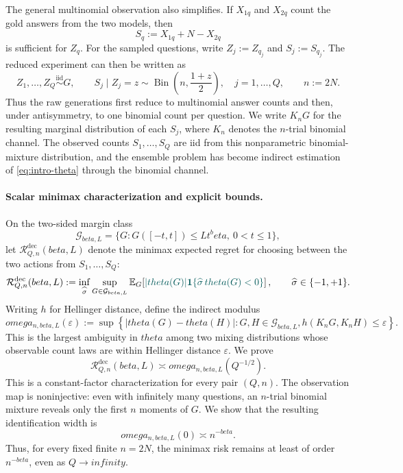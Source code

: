 \documentclass[11pt]{article}
\def\beta{beta}%
\def\theta{theta}%
\def\omega{omega}%
\def\infty{infinity}%
\newcommand{\E}{\mathbb E}
\newcommand{\one}{\mathbf 1}
\newcommand{\Bin}{\operatorname{Bin}}
\newcommand{\calG}{\mathcal G}
\newcommand{\calR}{\mathcal R}
\newcommand{\eps}{\varepsilon}
\newcommand\ced[1]{{\color{teal!70!black} #1}}
\begin{document}
The general multinomial observation also simplifies.  If $X_{1q}$ and $X_{2q}$ count the gold answers from the two models, then
\[
S_q:=X_{1q}+N-X_{2q}
\]
is sufficient for $Z_q$.  For the sampled questions, write $Z_j:=Z_{q_j}$ and $S_j:=S_{q_j}$.  The reduced experiment can then be written as
\begin{equation}
\label{eq:intro-binomial-channel}
Z_1,\ldots,Z_Q\overset{\mathrm{iid}}{\sim}G,
\qquad
S_j\mid Z_j=z
\sim
\Bin\left(n,\frac{1+z}{2}\right),
\quad j=1,\ldots,Q,
\qquad n:=2N.
\end{equation}
Thus the raw generations first reduce to multinomial answer counts and then, under antisymmetry, to one binomial count per question.  We write $K_nG$ for the resulting marginal distribution of each $S_j$, where $K_n$ denotes the $n$-trial binomial channel.  The observed counts $S_1,\ldots,S_Q$ are iid from this nonparametric binomial-mixture distribution, and the ensemble problem has become indirect estimation of \eqref{eq:intro-theta} through the binomial channel.

\paragraph{Scalar minimax characterization and explicit bounds.}
On the two-sided margin class
\[
\calG_{\beta,L}
=
\{G:G([-t,t])\le Lt^\beta,\ 0<t\le1\},
\]
let $\calR^{\mathrm{dec}}_{Q,n}(\beta,L)$ denote the minimax expected regret for choosing between the two actions from $S_1,\ldots,S_Q$:
\[
\calR^{\mathrm{dec}}_{Q,n}(\beta,L)
:=
\inf_{\widehat\sigma}
\sup_{G\in\calG_{\beta,L}}
\E_G\!\left[
\ced{|\theta(G)|
\one\{\widehat\sigma\,\theta(G)<0\}}
\right],
\qquad \widehat\sigma\in\{-1,+1\}.
\]
Writing $h$ for Hellinger distance, define the indirect modulus
\[
\omega_{n,\beta,L}(\eps)
:=
\sup\left\{
|\theta(G)-\theta(H)|:
G,H\in\calG_{\beta,L},
h(K_nG,K_nH)\le\eps
\right\}.
\]
This is the largest ambiguity in $\theta$ among two mixing distributions whose observable count laws are within Hellinger distance $\eps$.  We prove %
\begin{equation}
\label{eq:intro-modulus}
\calR^{\mathrm{dec}}_{Q,n}(\beta,L)
\asymp
\omega_{n,\beta,L}(Q^{-1/2}).
\end{equation}
This is a constant-factor characterization for every pair $(Q,n)$.  The observation map is noninjective: even with infinitely many questions, an $n$-trial binomial mixture reveals only the first $n$ moments of $G$.  We show that the resulting identification width is
\begin{equation}
\label{eq:intro-floor}
\omega_{n,\beta,L}(0)
\asymp
n^{-\beta}.
\end{equation}
Thus, for every fixed finite $n=2N$, the minimax risk remains at least of order $n^{-\beta}$, even as $Q\to\infty$.
\end{document}
